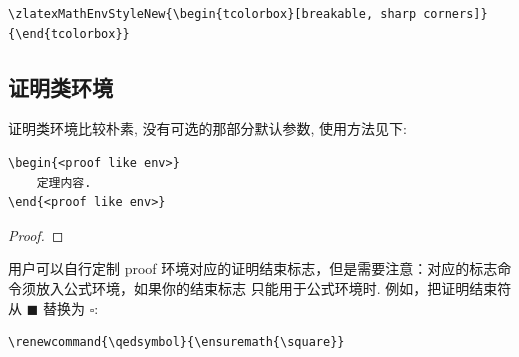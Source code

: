 \begin{theorem}
  \boomen \par 
  \boomcn
\end{theorem}

\begin{definition}
  \boomen \par 
  \boomcn
\end{definition}

\begin{verbatim}
\zlatexMathEnvStyleNew{\begin{tcolorbox}[breakable, sharp corners]}{\end{tcolorbox}}
\end{verbatim}
\begin{axiom}
  \boomen \par 
  \boomcn
\end{axiom}

\subsection{证明类环境}
证明类环境比较朴素, 没有可选的那部分默认参数, 使用方法见下:
\begin{verbatim}
\begin{<proof like env>}
    定理内容.
\end{<proof like env>}
\end{verbatim}
\vspace*{-2em}

\begin{proof}
    \boomen \par 
    \boomcn
\end{proof}

\begin{example}
    \boomen \par 
    \boomcn
\end{example}

用户可以自行定制 proof 环境对应的证明结束标志，但是需要注意：对应的标志命令须放入公式环境，如果你的结束标志
只能用于公式环境时. 例如，把证明结束符从 \(\blacksquare\) 替换为 $\square$:
\begin{verbatim}
\renewcommand{\qedsymbol}{\ensuremath{\square}}
\end{verbatim}


